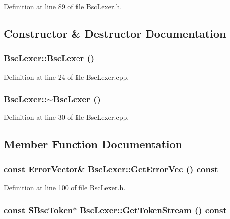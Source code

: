 Definition at line 89 of file BscLexer.h.

\subsection{Constructor \& Destructor Documentation}
\hypertarget{class_bsc_lexer_df8d1464bff758687744adc194451288}{
\subsubsection[{BscLexer}]{\setlength{\rightskip}{0pt plus 5cm}BscLexer::BscLexer ()}}
\label{class_bsc_lexer_df8d1464bff758687744adc194451288}




Definition at line 24 of file BscLexer.cpp.\hypertarget{class_bsc_lexer_af090a37a94febc2eb6177f320b07017}{
\subsubsection[{$\sim$BscLexer}]{\setlength{\rightskip}{0pt plus 5cm}BscLexer::$\sim$BscLexer ()}}
\label{class_bsc_lexer_af090a37a94febc2eb6177f320b07017}




Definition at line 30 of file BscLexer.cpp.

\subsection{Member Function Documentation}
\hypertarget{class_bsc_lexer_97242fc1951fd5343e1b785a89146058}{
\subsubsection[{GetErrorVec}]{\setlength{\rightskip}{0pt plus 5cm}const {\bf ErrorVector}\& BscLexer::GetErrorVec () const}}
\label{class_bsc_lexer_97242fc1951fd5343e1b785a89146058}




Definition at line 100 of file BscLexer.h.\hypertarget{class_bsc_lexer_6cd18bcdd16ddc8e7f350ee1f91541c8}{
\subsubsection[{GetTokenStream}]{\setlength{\rightskip}{0pt plus 5cm}const {\bf SBscToken}$\ast$ BscLexer::GetTokenStream () const}}
\label{class_bsc_lexer_6cd18bcdd16ddc8e7f350ee1f91541c8}




